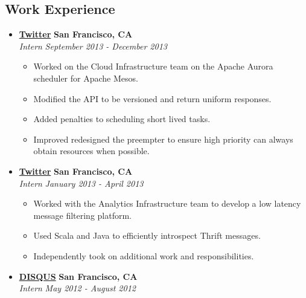 \documentclass[10pt,letterpaper]{article}
\begin{document}
\subsection*{Work Experience}
  \begin{itemize}
    \parskip=-0.1em

    \item[]
    {\href{http://www.twitter.com}{\textbf{Twitter}} \hfill
      \textbf{San Francisco, CA}}
    \\
    {\emph{Intern} \hfill \emph{September 2013 - December 2013}}

    \begin{itemize}[label=\textbullet]
      \itemsep0em
      \item Worked on the Cloud Infrastructure team on the Apache Aurora
        scheduler for Apache Mesos.
      \item Modified the API to be versioned and return uniform responses.
      \item Added penalties to scheduling short lived tasks.
      \item Improved redesigned the preempter to ensure high priority can always
        obtain resources when possible.
    \end{itemize}

    \item[]
    {\href{http://www.twitter.com}{\textbf{Twitter}} \hfill
      \textbf{San Francisco, CA}}
    \\
    {\emph{Intern} \hfill \emph{January 2013 - April 2013}}

    \begin{itemize}[label=\textbullet]
      \itemsep0em
      \item Worked with the Analytics Infrastructure team to develop a low
      latency message filtering platform.
      \item Used Scala and Java to efficiently introspect Thrift messages.
      \item Independently took on additional work and responsibilities.
    \end{itemize}

    \item[]
    {\href{http://www.disqus.com}{\textbf{DISQUS}} \hfill
      \textbf{San Francisco, CA}}
    \\
    {\emph{Intern} \hfill \emph{May 2012 - August 2012}}


\end{itemize}
\end{document}
